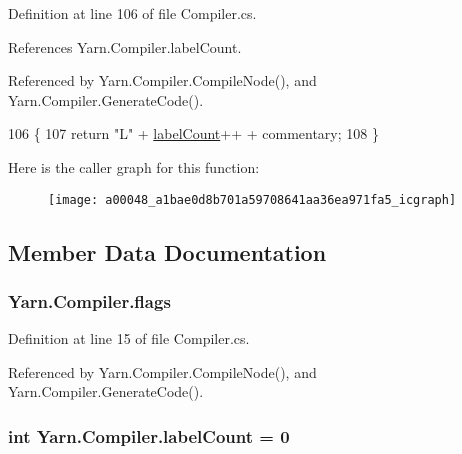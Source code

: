 Definition at line 106 of file Compiler.\-cs.



References Yarn.\-Compiler.\-label\-Count.



Referenced by Yarn.\-Compiler.\-Compile\-Node(), and Yarn.\-Compiler.\-Generate\-Code().


\begin{DoxyCode}
106                                                        \{
107             \textcolor{keywordflow}{return} \textcolor{stringliteral}{"L"} + \hyperlink{a00048_a87758397eba2e84cda8e0d6c40656f3f}{labelCount}++ + commentary;
108         \}
\end{DoxyCode}


Here is the caller graph for this function\-:
\nopagebreak
\begin{figure}[H]
\begin{center}
\leavevmode
\texttt{[image: a00048\_a1bae0d8b701a59708641aa36ea971fa5\_icgraph]}
\end{center}
\end{figure}




\subsection{Member Data Documentation}
\hypertarget{a00048_a541022d89bcf9bc8f794eb6d6b438d08}{
\subsubsection[{flags}]{ Yarn.\-Compiler.\-flags\hspace{0.3cm}{\ttfamily [private]}}}\label{a00048_a541022d89bcf9bc8f794eb6d6b438d08}


Definition at line 15 of file Compiler.\-cs.



Referenced by Yarn.\-Compiler.\-Compile\-Node(), and Yarn.\-Compiler.\-Generate\-Code().

\hypertarget{a00048_a87758397eba2e84cda8e0d6c40656f3f}{
\subsubsection[{label\-Count}]{\setlength{\rightskip}{0pt plus 5cm}int Yarn.\-Compiler.\-label\-Count = 0\hspace{0.3cm}{\ttfamily [private]}}}\label{a00048_a87758397eba2e84cda8e0d6c40656f3f}


